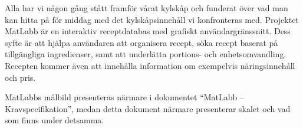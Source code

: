 Alla har vi någon gång stått framför vårat kylskåp och funderat över vad man kan hitta på för middag med det kylskåpsinnehåll vi konfronteras med. Projektet MatLabb är en interaktiv receptdatabas med grafiskt användargränssnitt. Dess syfte är att hjälpa användaren att organisera recept, söka recept baserat på tillgängliga ingredienser, samt att underlätta portions- och enhetsomvandling. Recepten kommer även att innehålla information om exempelvis näringsinnehåll och pris.

MatLabbs målbild presenteras närmare i dokumentet ``MatLabb -- Kravspecifikation'', medan detta dokument närmare presenterar skalet och vad som finns under detsamma.

